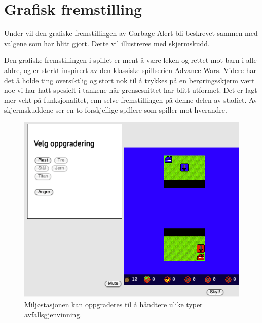 \section{Grafisk fremstilling}\label{sec:artwork}
Under vil den grafiske fremstillingen av Garbage Alert bli beskrevet
sammen med valgene som har blitt gjort. Dette vil illustreres med
skjermskudd.

Den grafiske fremstillingen i spillet er ment å være leken og rettet mot
barn i alle aldre, og er sterkt inspirert av den klassiske spillserien
Advance Wars. Videre har det å holde ting oversiktlig og stort nok til å
trykkes på en berøringsskjerm vært noe vi har hatt spesielt i tankene
når grensesnittet har blitt utformet. Det er lagt mer vekt på
funksjonalitet, enn selve fremstillingen på denne delen av stadiet. Av
skjermskuddene ser en to forskjellige spillere som spiller mot
hverandre.

\begin{figure} [H]
\centering
\includegraphics[width=\textwidth]{images/Oppgradering.png}
\caption{Miljøstasjonen kan oppgraderes til å håndtere ulike typer avfallsgjenvinning.}
\label{fig:Oppgradering}
\end{figure}


